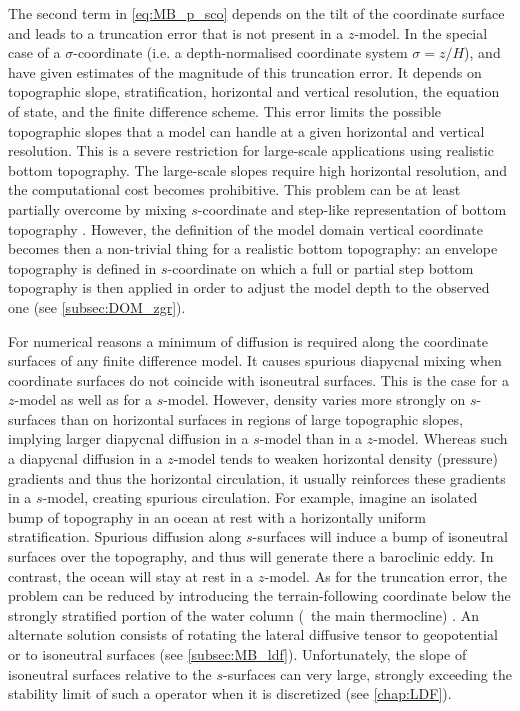 \documentclass[../main/NEMO_manual]{subfiles}
\begin{document}
The second term in \autoref{eq:MB_p_sco} depends on the tilt of the coordinate surface and
leads to a truncation error that is not present in a $z$-model.
In the special case of a $\sigma$-coordinate
(i.e. a depth-normalised coordinate system $\sigma = z/H$),
\citet{haney_JPO91} and \citet{beckmann.haidvogel_JPO93} have given estimates of
the magnitude of this truncation error.
It depends on topographic slope, stratification, horizontal and vertical resolution,
the equation of state, and the finite difference scheme.
This error limits the possible topographic slopes that a model can handle at
a given horizontal and vertical resolution.
This is a severe restriction for large-scale applications using realistic bottom topography.
The large-scale slopes require high horizontal resolution,
and the computational cost becomes prohibitive.
This problem can be at least partially overcome by mixing $s$-coordinate and
step-like representation of bottom topography
\citep{gerdes_JGR93*a,gerdes_JGR93*b,madec.delecluse.ea_JPO96}.
However, the definition of the model domain vertical coordinate becomes then a non-trivial thing for
a realistic bottom topography:
an envelope topography is defined in $s$-coordinate on which
a full or partial step bottom topography is then applied in order to
adjust the model depth to the observed one (see \autoref{subsec:DOM_zgr}).

For numerical reasons a minimum of diffusion is required along
the coordinate surfaces of any finite difference model.
It causes spurious diapycnal mixing when coordinate surfaces do not coincide with isoneutral surfaces.
This is the case for a $z$-model as well as for a $s$-model.
However, density varies more strongly on $s$-surfaces than on horizontal surfaces in
regions of large topographic slopes,
implying larger diapycnal diffusion in a $s$-model than in a $z$-model.
Whereas such a diapycnal diffusion in a $z$-model tends to
weaken horizontal density (pressure) gradients and thus the horizontal circulation,
it usually reinforces these gradients in a $s$-model, creating spurious circulation.
For example, imagine an isolated bump of topography in
an ocean at rest with a horizontally uniform stratification.
Spurious diffusion along $s$-surfaces will induce a bump of isoneutral surfaces over the topography,
and thus will generate there a baroclinic eddy.
In contrast, the ocean will stay at rest in a $z$-model.
As for the truncation error, the problem can be reduced by
introducing the terrain-following coordinate below the strongly stratified portion of the water column
(\ie\ the main thermocline) \citep{madec.delecluse.ea_JPO96}.
An alternate solution consists of rotating the lateral diffusive tensor to
geopotential or to isoneutral surfaces (see \autoref{subsec:MB_ldf}).
Unfortunately, the slope of isoneutral surfaces relative to the $s$-surfaces can very large,
strongly exceeding the stability limit of such a operator when it is discretized
(see \autoref{chap:LDF}).
\end{document}
